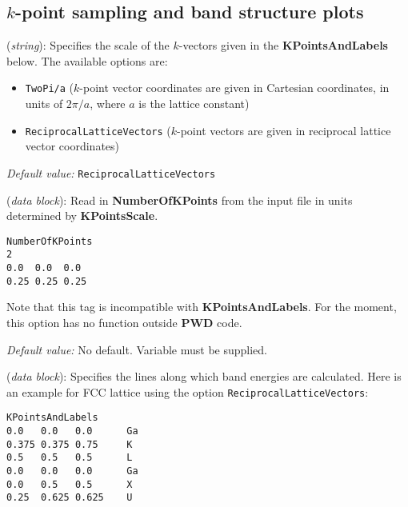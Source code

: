 
\subsection{$k$-point sampling and band structure plots}

\begin{description}
\itemsep 10pt
\parsep 0pt

\item[{\bf KPointsScale}] ({\it string}):
Specifies the scale of the $k$-vectors given in the {\bf
KPointsAndLabels} below. The available options are:

\begin{itemize}
\item {\tt TwoPi/a} ($k$-point vector coordinates are given in Cartesian
coordinates, in units of $2\pi/a$, where $a$ is the lattice constant)
\item {\tt ReciprocalLatticeVectors} ($k$-point vectors are given in
reciprocal lattice vector coordinates)
\end{itemize}

{\it Default value:} {\tt ReciprocalLatticeVectors}

\item[{\bf NumberOfKPoints}] ({\it data block}):
Read in {\bf NumberOfKPoints} from the input file in units determined by
{\bf KPointsScale}.

\begin{verbatim}
NumberOfKPoints
2
0.0  0.0  0.0
0.25 0.25 0.25
\end{verbatim}

Note that this tag is incompatible with {\bf KPointsAndLabels}. For the
moment, this option has no function outside {\bf PWD} code.

{\it Default value:} No default.  Variable must be supplied.

\item[{\bf KPointsAndLabels}] ({\it data block}):
Specifies the lines along which band energies are calculated. Here is an
example for FCC lattice using the option {\tt ReciprocalLatticeVectors}:

\begin{verbatim}
KPointsAndLabels
0.0   0.0   0.0      Ga
0.375 0.375 0.75     K
0.5   0.5   0.5      L
0.0   0.0   0.0      Ga
0.0   0.5   0.5      X
0.25  0.625 0.625    U
\end{verbatim}


\end{description}
